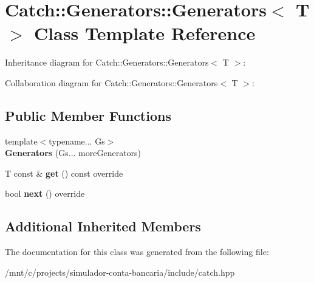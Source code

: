 \hypertarget{classCatch_1_1Generators_1_1Generators}{}\section{Catch\+:\+:Generators\+:\+:Generators$<$ T $>$ Class Template Reference}
\label{classCatch_1_1Generators_1_1Generators}


Inheritance diagram for Catch\+:\+:Generators\+:\+:Generators$<$ T $>$\+:


Collaboration diagram for Catch\+:\+:Generators\+:\+:Generators$<$ T $>$\+:
\subsection*{Public Member Functions}
\begin{DoxyCompactItemize}
\item 
\mbox{\label{classCatch_1_1Generators_1_1Generators_a0288170b30cd0fdfef6efc2d9bc8acba}} 
{\footnotesize template$<$typename... Gs$>$ }\\{\bfseries Generators} (Gs... more\+Generators)
\item 
\mbox{\label{classCatch_1_1Generators_1_1Generators_a66705482b7efa88cae6e6b7062d5de6a}} 
T const  \& {\bfseries get} () const override
\item 
\mbox{\label{classCatch_1_1Generators_1_1Generators_ad127fd2a07347b527f79ab3b78bd40fb}} 
bool {\bfseries next} () override
\end{DoxyCompactItemize}
\subsection*{Additional Inherited Members}


The documentation for this class was generated from the following file\+:\begin{DoxyCompactItemize}
\item 
/mnt/c/projects/simulador-\/conta-\/bancaria/include/catch.\+hpp\end{DoxyCompactItemize}
